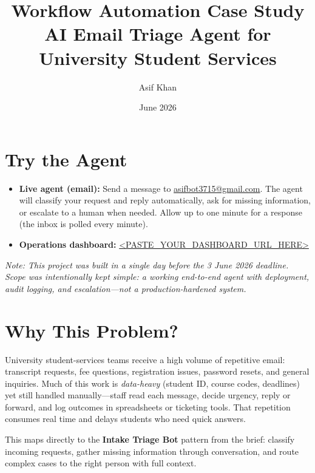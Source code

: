 \documentclass[11pt,a4paper]{article}
\title{\textbf{Workflow Automation Case Study}\\[0.4em]
\large AI Email Triage Agent for University Student Services}
\author{Asif Khan}
\date{June 2026}
\begin{document}
\maketitle

\section*{Try the Agent}

\begin{itemize}[leftmargin=*, nosep]
  \item \textbf{Live agent (email):} Send a message to \href{mailto:asifbot3715@gmail.com}{asifbot3715@gmail.com}.
        The agent will classify your request and reply automatically, ask for missing information, or escalate to a human when needed.
        Allow up to one minute for a response (the inbox is polled every minute).
  \item \textbf{Operations dashboard:} \url{<PASTE\_YOUR\_DASHBOARD\_URL\_HERE>}
\end{itemize}

\vspace{0.5em}
\noindent\textit{Note: This project was built in a single day before the 3 June 2026 deadline. Scope was intentionally kept simple: a working end-to-end agent with deployment, audit logging, and escalation---not a production-hardened system.}

\section{Why This Problem?}

University student-services teams receive a high volume of repetitive email: transcript requests, fee questions, registration issues, password resets, and general inquiries. Much of this work is \emph{data-heavy} (student ID, course codes, deadlines) yet still handled manually---staff read each message, decide urgency, reply or forward, and log outcomes in spreadsheets or ticketing tools. That repetition consumes real time and delays students who need quick answers.

This maps directly to the \textbf{Intake Triage Bot} pattern from the brief: classify incoming requests, gather missing information through conversation, and route complex cases to the right person with full context.
\end{document}
